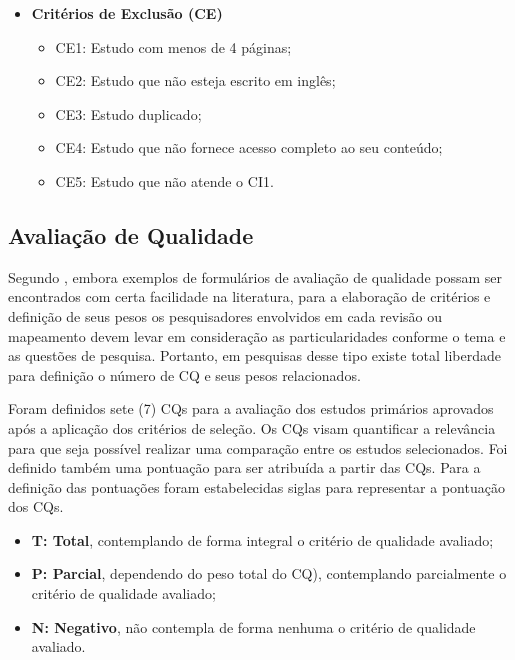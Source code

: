 \begin{itemize}
    \item \textbf{Critérios de Exclusão (\ac{CE})}
    \begin{itemize}
        \item CE1: Estudo com menos de 4 páginas;  
        \item CE2: Estudo que não esteja escrito em inglês;
        \item CE3: Estudo duplicado;
        \item CE4: Estudo que não fornece acesso completo ao seu conteúdo;
        \item CE5: Estudo que não atende o CI1.
    \end{itemize}
\end{itemize}
    
    \subsection{Avaliação de Qualidade} \label{scec:AvalQualidade}

Segundo , embora exemplos de formulários de avaliação de qualidade possam ser encontrados com certa facilidade na literatura, para a elaboração de critérios e definição de seus pesos os pesquisadores envolvidos em cada revisão ou mapeamento devem levar em consideração as particularidades conforme o tema e as questões de pesquisa.
Portanto, em pesquisas desse tipo existe total liberdade para definição o número de \acs{CQ} e seus pesos relacionados. 

Foram definidos sete (7) \acp{CQ} para a avaliação dos estudos primários aprovados após a aplicação dos critérios de seleção. 
Os \acp{CQ} visam quantificar a relevância para que seja possível realizar uma comparação entre os estudos selecionados. 
Foi definido também uma pontuação para ser atribuída a partir das \acp{CQ}. 
Para a definição das pontuações foram estabelecidas siglas para representar a pontuação dos \acp{CQ}. 

\begin{itemize}
    \item \textbf{T: Total}, contemplando de forma integral o critério de qualidade avaliado;
    \item \textbf{P: Parcial}, dependendo do peso total do \ac{CQ}), contemplando parcialmente o critério de qualidade avaliado;
    \item \textbf{N: Negativo}, não contempla de forma nenhuma o critério de qualidade avaliado.
\end{itemize}

